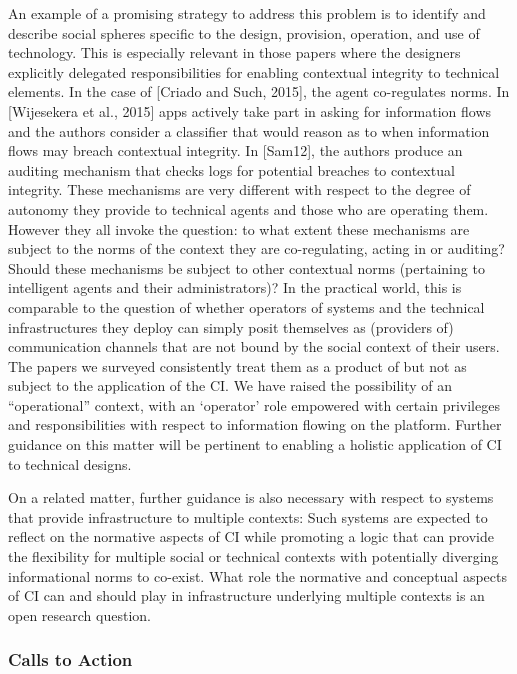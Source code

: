 \documentclass[../thesis.tex]{subfiles}
\begin{document}
An example of a promising strategy to address this problem is to
identify and describe social spheres specific to the design, provision,
operation, and use of technology. This is especially relevant in those
papers where the designers explicitly delegated responsibilities for
enabling contextual integrity to technical elements. In the case of
[Criado and Such, 2015], the agent co-regulates norms. In [Wijesekera
et al., 2015] apps actively take part in asking for information flows
and the authors consider a classifier that would reason as to when
information flows may breach contextual integrity. In [Sam12], the
authors produce an auditing mechanism that checks logs for potential
breaches to contextual integrity. These mechanisms are very different
with respect to the degree of autonomy they provide to technical agents
and those who are operating them. However they all invoke the question:
to what extent these mechanisms are subject to the norms of the context
they are co-regulating, acting in or auditing? Should these mechanisms
be subject to other contextual norms (pertaining to intelligent agents
and their administrators)? In the practical world, this is comparable
to the question of whether operators of systems and the technical
infrastructures they deploy can simply posit themselves as (providers
of) communication channels that are not bound by the social context of
their users. The papers we surveyed consistently treat them as a
product of but not as subject to the application of the CI. We have
raised the possibility of an
``operational'' context, with an
`operator' role empowered with certain
privileges and responsibilities with respect to information flowing on
the platform. Further guidance on this matter will be pertinent to
enabling a holistic application of CI to technical designs.

On a related matter, further guidance is also necessary with respect to
systems that provide infrastructure to multiple contexts: Such
systems are expected to reflect on the normative aspects of CI while
promoting a logic that can provide the flexibility for multiple social
or technical contexts with potentially diverging informational norms to
co-exist. What role the normative and conceptual aspects of CI can and
should play in infrastructure underlying multiple contexts is an open
research question.

\subsubsection{Calls to Action}
\label{CI5.1.2}
\end{document}

